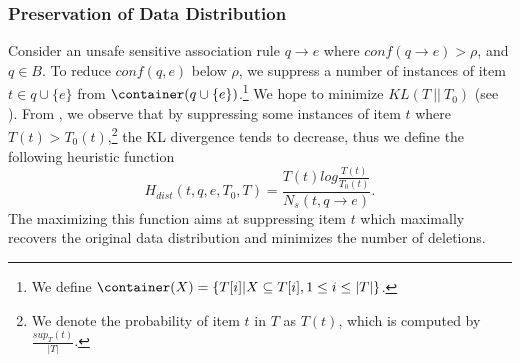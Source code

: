 \subsubsection{Preservation of Data Distribution}
Consider an unsafe sensitive association rule $q \rightarrow e$ where
$conf(q \rightarrow e) > \rho$, and $q \in B$.
To reduce $conf(q,e)$ below $\rho$,
we suppress a number of instances of item $t\in q \cup \{e\}$ from
$\container(q\cup \{e\})$.\footnote{We define $\container(X)=\{T[i]|X\subseteq T[i], 1\le i\le |T|\}$.} We hope to minimize $KL(T ~||~ T_0)$
(see ).
From , we observe that by suppressing some instances of item $t$
where $T(t)>T_0(t)$,\footnote{We denote the probability of item $t$ in $T$
as $T(t)$, which is computed by $\frac{sup_T(t)}{|T|}$.}
the KL divergence tends to decrease, thus we define
the following heuristic function
\begin{equation}\label{eq:hdist}
H_{dist}(t, q, e, T_0, T) =
	\frac{T(t)log\frac{T(t)}{T_0(t)}}{N_s(t, q\rightarrow e)}.
\end{equation}
The maximizing this function aims at
suppressing item $t$ which maximally recovers the original
data distribution and minimizes the number of deletions.

